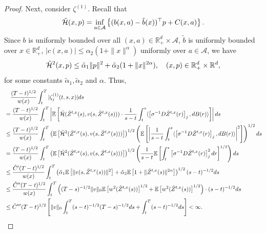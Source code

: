 \documentclass[11pt]{article}
\theoremstyle{definition}
\theoremstyle{plain}
\newcommand{\E}{\mathbb{E}}
\newcommand{\cH}{{\cal H}}
\newcommand{\tb}{\tilde{b}}
\begin{document}
\begin{appendices}
\begin{proof}
Next, consider \( \zeta^{(1)} \).  
Recall that  
\[
\tilde \cH(x,p) = \inf_{a \in \mathcal{A}} \left\{ (b(x,a) - \tb(x))^{\top} p + C(x,a) \right\}.
\]
Since \( b \) is uniformly bounded over all  
\( (x,a) \in \mathbb{R}_+^d \times \mathcal{A} \), \( \tb \) is uniformly bounded  
over \( x \in \mathbb{R}_+^d \), \( |c(x,a)| \leq \alpha_2 (1 + \|x\|^\alpha) \) uniformly  
over \( a \in \mathcal{A} \), we have  
\begin{equation}\label{eq:bound-H}
\tilde \cH^2 (x,p) \leq \tilde \alpha_1 \|p\|^2 + \tilde \alpha_2 (1 + \|x\|^{2\alpha}), \quad (x,p) \in \mathbb{R}_+^d \times \mathbb{R}^d,
\end{equation}
for some constants $\tilde \alpha_1, \tilde \alpha_2$ and $\alpha$. Thus,  
\begin{align*}
& \quad \frac{(T - t)^{1/2}}{w(x)} \int_t^T |\zeta_j^{(1)}(t,s,x)| ds \\
&= \frac{(T - t)^{1/2}}{w(x)} \int_t^T \left|\mathbb{E} \left[ \tilde \cH (\tilde{Z}^{t,x}(s), v(s, \tilde{Z}^{t,x}(s))) \cdot 
\frac{1}{s - t} \int_t^s \langle \left[\sigma^{-1} D\tilde Z^{t,x}(r)\right]_j, dB(r) \rangle \right] \right| ds\\
&\leq \frac{(T - t)^{1/2}}{w(x)} \int_t^T 
\left( \mathbb{E} \left[ \tilde \cH^2(\tilde{Z}^{t,x}(s), v(s, \tilde{Z}^{t,x}(s))) \right] \right)^{1/2} 
\left( \mathbb{E} \left[ \left| \frac{1}{s - t} \int_t^s \langle \left[\sigma^{-1} D\tilde Z^{t,x}(r)\right]_j, dB(r) \rangle \right|^2 \right] \right)^{1/2} ds\\
&= \frac{(T - t)^{1/2}}{w(x)} \int_t^T 
\left( \mathbb{E} \left[ \tilde \cH^2(\tilde{Z}^{t,x}(s), v(s, \tilde{Z}^{t,x}(s))) \right] \right)^{1/2} 
\left( \frac{1}{s - t} \E \left[\int_t^s \left[\sigma^{-1} D\tilde Z^{t,x}(r)\right]_j^2 dr \right]^{1/2}\right) ds \\
&\leq \frac{\tilde C'(T - t)^{1/2}}{w(x)} \int_t^T 
\left( \tilde \alpha_1 \mathbb{E} \left[\|v(s, \tilde{Z}^{t,x}(s))\|^2 \right] + \tilde \alpha_2 \E\left[1 + \|\tilde{Z}^{t,x}(s)\|^{2\alpha} \right]\right)^{1/2} (s - t)^{-1/2} ds \\
&\leq \frac{\tilde C''(T - t)^{1/2}}{w(x)} \int_t^T 
\left((T-s)^{-1/2} \|v\|_0 \mathbb{E} \left[ w^2(\tilde{Z}^{t,x}(s)) \right]^{1/2} + \mathbb{E} \left[ w^2(\tilde{Z}^{t,x}(s)) \right]^{1/2} \right) \cdot (s - t)^{-1/2} ds \\
&\leq \tilde C''' (T - t)^{1/2} \left[\|v\|_0 \int_t^T (s - t)^{-1/2} (T - s)^{-1/2} ds + \int_t^T (s - t)^{-1/2} ds \right] < \infty.

\end{align*}
\end{proof}
\end{appendices}
\end{document}

